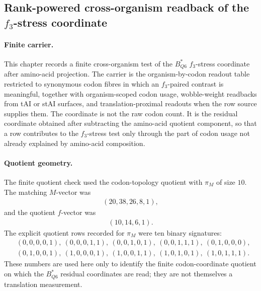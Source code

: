 
\subsection{Rank-powered cross-organism readback of the $f_3$-stress coordinate}
\label{subsec:h3-cross-layer-relation-f3-stress-cross-organism-b-star-q6-generality-powered}

\paragraph{Finite carrier.}
This chapter records a finite cross-organism test of the $B^{\ast}_{Q6}$ $f_3$-stress coordinate after amino-acid projection.  The carrier is the organism-by-codon readout table restricted to synonymous codon fibres in which an $f_3$-paired contrast is meaningful, together with organism-scoped codon usage, wobble-weight readbacks from tAI or stAI surfaces, and translation-proximal readouts when the row source supplies them.  The coordinate is not the raw codon count.  It is the residual coordinate obtained after subtracting the amino-acid quotient component, so that a row contributes to the $f_3$-stress test only through the part of codon usage not already explained by amino-acid composition.

\paragraph{Quotient geometry.}
The finite quotient check used the codon-topology quotient with $\pi_M$ of size $10$.  The matching $M$-vector was
$$
\begin{aligned}
(20,38,26,8,1),
\end{aligned}
$$
and the quotient $f$-vector was
$$
\begin{aligned}
(10,14,6,1).
\end{aligned}
$$
The explicit quotient rows recorded for $\pi_M$ were ten binary signatures:
$$
\begin{aligned}
&(0,0,0,0,1),\ (0,0,0,1,1),\ (0,0,1,0,1),\ (0,0,1,1,1),\ (0,1,0,0,0),\\
&(0,1,0,0,1),\ (1,0,0,0,1),\ (1,0,0,1,1),\ (1,0,1,0,1),\ (1,0,1,1,1).
\end{aligned}
$$
These numbers are used here only to identify the finite codon-coordinate quotient on which the $B^{\ast}_{Q6}$ residual coordinates are read; they are not themselves a translation measurement.

